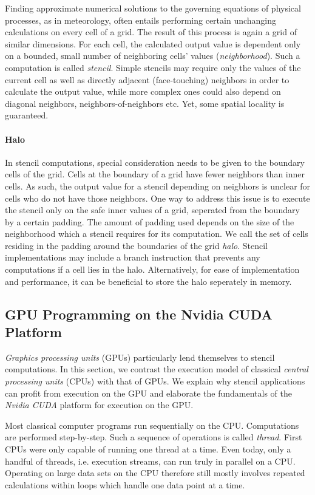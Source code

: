 Finding approximate numerical solutions to the governing equations of physical processes, as in meteorology, often entails performing certain unchanging calculations on every cell of a grid. The result of this process is again a grid of similar dimensions. For each cell, the calculated output value is dependent only on a bounded, small number of neighboring cells' values (\emph{neighborhood}). Such a computation is called \emph{stencil}. Simple stencils may require only the values of the current cell as well as directly adjacent (face-touching) neighbors in order to calculate the output value, while more complex ones could also depend on diagonal neighbors, neighbors-of-neighbors etc. Yet, some spatial locality is guaranteed. 

\paragraph{Halo} In stencil computations, special consideration needs to be given to the boundary cells of the grid. Cells at the boundary of a grid have fewer neighbors than inner cells. As such, the output value for a stencil depending on neigbhors is unclear for cells who do not have those neighbors. One way to address this issue is to execute the stencil only on the safe inner values of a grid, seperated from the boundary by a certain padding. The amount of padding used depends on the size of the neighborhood which a stencil requires for its computation. We call the set of cells residing in the padding around the boundaries of the grid \emph{halo}. Stencil implementations may include a branch instruction that prevents any computations if a cell lies in the halo. Alternatively, for ease of implementation and performance, it can be beneficial to store the halo seperately in memory.

\subsection{GPU Programming on the Nvidia CUDA Platform}

\emph{Graphics processing units} (GPUs) particularly lend themselves to stencil computations. In this section, we contrast the execution model of classical \emph{central processing units} (CPUs) with that of GPUs. We explain why stencil applications can profit from execution on the GPU and elaborate the fundamentals of the \emph{Nvidia CUDA} platform for execution on the GPU.

Most classical computer programs run sequentially on the CPU. Computations are performed step-by-step. Such a sequence of operations is called \emph{thread}. First CPUs were only capable of running one thread at a time. Even today, only a handful of threads, i.e. execution streams, can run truly in parallel on a CPU. Operating on large data sets on the CPU therefore still mostly involves repeated calculations within loops which handle one data point at a time.

